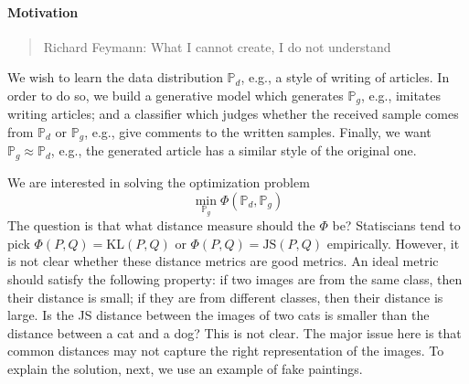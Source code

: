 \paragraph{Motivation}
\begin{quotation}{Richard Feymann:}
What I cannot create, I do not understand
\end{quotation}
We wish to learn the data distribution $\mathbb{P}_d$, e.g., a style of writing of articles.
In order to do so, we build a generative model which generates $\mathbb{P}_g$, e.g., imitates writing articles;
and a classifier which judges whether the received sample comes from $\mathbb{P}_d$ or $\mathbb{P}_g$, e.g., give comments to the written samples.
Finally, we want $\mathbb{P}_g\approx\mathbb{P}_d$, e.g., the generated article has a similar style of the original one.

We are interested in solving the optimization problem 
\[
\min_{\mathbb{P}_g}\Phi(\mathbb{P}_d,\mathbb{P}_g)
\]
The question is that what distance measure should the $\Phi$ be?
Statiscians tend to pick $\Phi(P,Q)=\text{KL}(P,Q)$ or $\Phi(P,Q)=\text{JS}(P,Q)$ empirically.
However, it is not clear whether these distance metrics are good metrics. An ideal metric should satisfy the following property: if two images are from the same class, then their distance is small; if they are from different classes, then their distance is large. Is the JS distance between the images of two cats is smaller than the distance between a cat and a dog? This is not clear. The major issue here is that common distances may not capture the right representation of the images. To explain the solution, next, we use an example of fake paintings.
